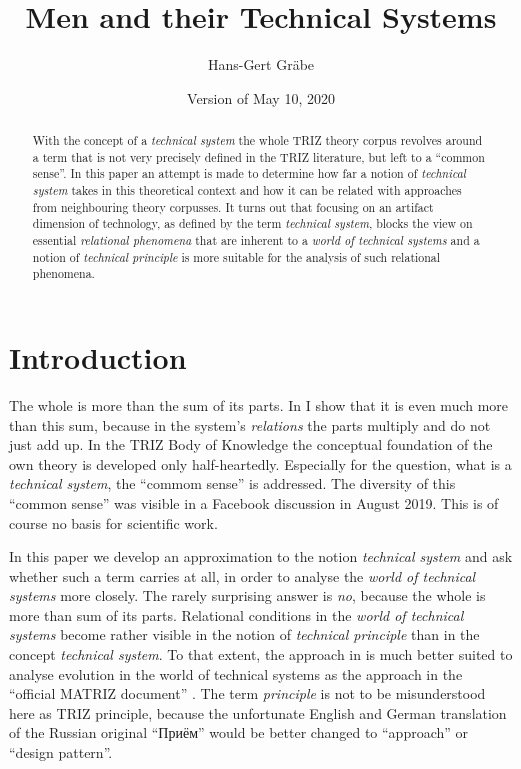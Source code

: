 \documentclass{llncs}
\title{Men and their Technical Systems}
\author{Hans-Gert Gräbe\orcidID{0000-0002-3934-413X}}
\institute{Leipzig University, D-04009 Leipzig, Germany,\\    
  \email{graebe@informatik.uni-leipzig.de},\\ WWW home page:
  \texttt{http://informatik.uni-leipzig.de/\~{}graebe}}
\date{Version of May 10, 2020}
\begin{document}
\maketitle

\begin{abstract}
  With the concept of a \emph{technical system} the whole TRIZ theory corpus
  revolves around a term that is not very precisely defined in the TRIZ
  literature, but left to a ``common sense''.  In this paper an attempt is
  made to determine how far a notion of \emph{technical system} takes in this
  theoretical context and how it can be related with approaches from
  neighbouring theory corpusses.  It turns out that focusing on an artifact
  dimension of technology, as defined by the term \emph{technical system},
  blocks the view on essential \emph{relational phenomena} that are inherent
  to a \emph{world of technical systems} and a notion of \emph{technical
    principle} is more suitable for the analysis of such relational phenomena.
\end{abstract}

\section{Introduction}

The whole is more than the sum of its parts. In \cite{Graebe2020a} I show that
it is even much more than this sum, because in the system's \emph{relations}
the parts multiply and do not just add up.  In the TRIZ Body of Knowledge
\cite{TBK-2007} the conceptual foundation of the own theory is developed only
half-heartedly. Especially for the question, what is a \emph{technical
  system}, the ``commom sense'' is addressed. The diversity of this ``common
sense'' was visible in a Facebook discussion \cite{Graebe2019} in August
2019.  This is of course no basis for scientific work.

In this paper we develop an approximation to the notion \emph{technical
  system} and ask whether such a term carries at all, in order to analyse the
\emph{world of technical systems} more closely.  The rarely surprising answer
is \emph{no}, because the whole is more than sum of its parts.  Relational
conditions in the \emph{world of technical systems} become rather visible in
the notion of \emph{technical principle} than in the concept \emph{technical
  system}. To that extent, the approach in \cite{Shpakovsky2010} is much
better suited to analyse evolution in the world of technical systems as the
approach in the ``official MATRIZ document'' \cite{TESE2018}.  The term
\emph{principle} is not to be misunderstood here as TRIZ principle, because
the unfortunate English and German translation of the Russian original
\foreignlanguage{russian}{``Приём''} would be better changed to ``approach''
or ``design pattern''.
\end{document}
